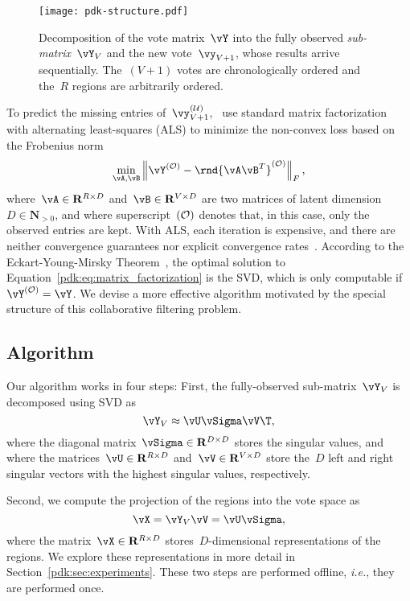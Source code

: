 \begin{figure}
	\centering
	\texttt{[image: pdk-structure.pdf]}
	\caption{
		Decomposition of the vote matrix~$\vY$ into the fully observed \emph{sub-matrix}~$\vY_V$ and the new vote~$\vy_{V+1}$, whose results arrive sequentially.
		The~$(V+1)$ votes are chronologically ordered and the~$R$ regions are arbitrarily ordered.
	}
	\label{pdk:fig:structure}
\end{figure}

To predict the missing entries of~$\vy^{(\Ubs)}_{V+1}$,~\citet{etter2016online} use standard matrix factorization with alternating least-squares (ALS) to minimize the non-convex loss based on the Frobenius norm
\begin{equation}
	\label{pdk:eq:matrix_factorization}
	\min_{\vA, \vB} \left\Vert \vY^{(\Obs)} - \rnd{\vA\vB^T}^{(\Obs)} \right\Vert_F,
\end{equation}
where~$\vA \in \mathbf{R}^{R \times D}$ and~$\vB \in \mathbf{R}^{V \times D}$ are two matrices of latent dimension~$D \in \mathbf{N}_{>0}$, and where superscript~$(\mathcal{O})$ denotes that, in this case, only the observed entries are kept.
With ALS, each iteration is expensive, and there are neither convergence guarantees nor explicit convergence rates~\cite{bell2007scalable, koren2009matrix}.
According to the Eckart-Young-Mirsky Theorem~\citep{eckart1936approximation}, the optimal solution to Equation~\eqref{pdk:eq:matrix_factorization} is the SVD, which is only computable if~$\vY^{(\Obs)}=\vY$.
We devise a more effective algorithm motivated by the special structure of this collaborative filtering problem\cite{etter2016online}.

\subsection{Algorithm}

Our algorithm works in four steps:
First, the fully-observed sub-matrix~$\vY_V$ is decomposed using SVD as
\begin{equation}
	\label{pdk:eq:svd}
	\vY_V \approx \vU \vSigma \vV\T,
\end{equation}
where the diagonal matrix~$\vSigma \in \mathbf{R}^{D \times D}$ stores the singular values, and where the matrices~$\vU \in \mathbf{R}^{R \times D}$ and~$\vV \in \mathbf{R}^{V \times D}$ store the~$D$ left and right singular vectors with the highest singular values, respectively.

Second, we compute the projection of the regions into the vote space as
\begin{equation}
	\label{pdk:eq:projection}
	\vX = \vY_V \vV = \vU \vSigma,
\end{equation}
where the matrix~$\vX \in \mathbf{R}^{R \times D}$ stores~$D$-dimensional representations of the regions.
We explore these representations in more detail in Section~\ref{pdk:sec:experiments}.
These two steps are performed offline, \textit{i.e.}, they are performed once.

